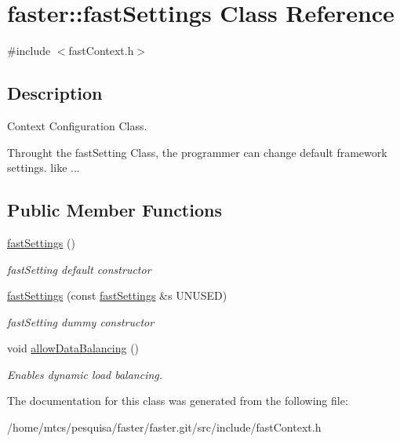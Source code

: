 \hypertarget{classfaster_1_1fastSettings}{}\section{faster\+:\+:fast\+Settings Class Reference}
\label{classfaster_1_1fastSettings}


{\ttfamily \#include $<$fast\+Context.\+h$>$}



\subsection{Description}
Context Configuration Class. 

Throught the fast\+Setting Class, the programmer can change default framework settings. like ... \subsection*{Public Member Functions}
\begin{DoxyCompactItemize}
\item 
\hypertarget{classfaster_1_1fastSettings_a29deb352bf81074dac468dfe5af20cc5}{}\label{classfaster_1_1fastSettings_a29deb352bf81074dac468dfe5af20cc5} 
\hyperlink{classfaster_1_1fastSettings_a29deb352bf81074dac468dfe5af20cc5}{fast\+Settings} ()
\begin{DoxyCompactList}\small\item\em fast\+Setting default constructor \end{DoxyCompactList}\item 
\hypertarget{classfaster_1_1fastSettings_ae63a2b5a6accbf3600bc9ac659269532}{}\label{classfaster_1_1fastSettings_ae63a2b5a6accbf3600bc9ac659269532} 
\hyperlink{classfaster_1_1fastSettings_ae63a2b5a6accbf3600bc9ac659269532}{fast\+Settings} (const \hyperlink{classfaster_1_1fastSettings}{fast\+Settings} \&s U\+N\+U\+S\+ED)
\begin{DoxyCompactList}\small\item\em fast\+Setting dummy constructor \end{DoxyCompactList}\item 
\hypertarget{classfaster_1_1fastSettings_a33acd4169431c784d12bf960cacda6ed}{}\label{classfaster_1_1fastSettings_a33acd4169431c784d12bf960cacda6ed} 
void \hyperlink{classfaster_1_1fastSettings_a33acd4169431c784d12bf960cacda6ed}{allow\+Data\+Balancing} ()
\begin{DoxyCompactList}\small\item\em Enables dynamic load balancing. \end{DoxyCompactList}\end{DoxyCompactItemize}


The documentation for this class was generated from the following file\+:\begin{DoxyCompactItemize}
\item 
/home/mtcs/pesquisa/faster/faster.\+git/src/include/fast\+Context.\+h\end{DoxyCompactItemize}
